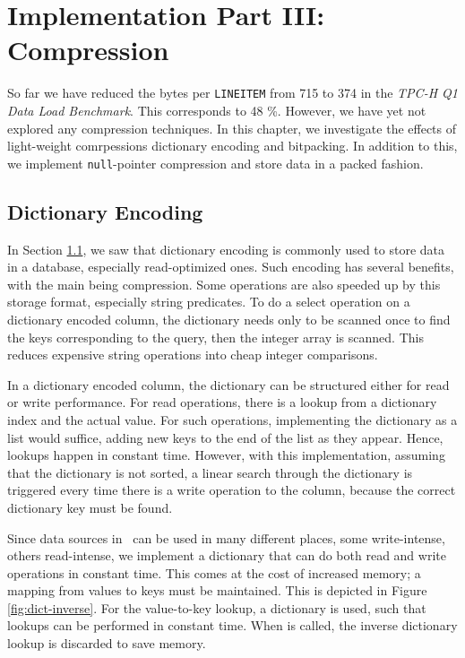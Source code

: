 \chapter{Implementation Part III: Compression}
\label{chap:Compression}
So far we have reduced the bytes per \texttt{LINEITEM} from 715 to 374 in the \textit{TPC-H Q1 Data Load Benchmark}. This corresponds to 48 \%. However, we have yet not explored any compression techniques. In this chapter, we investigate the effects of light-weight comrpessions dictionary encoding and bitpacking. In addition to this, we implement \texttt{null}-pointer compression and store data in a packed fashion.

\section{Dictionary Encoding}
\label{sec:Dictionary Encoding}
In Section \ref{sec:Dictionary Encoding}, we saw that dictionary encoding is commonly used to store data in a database, especially read-optimized ones. Such encoding has several benefits, with the main being compression. Some operations are also speeded up by this storage format, especially string predicates. To do a select operation on a dictionary encoded column, the dictionary needs only to be scanned once to find the keys corresponding to the query, then the integer array is scanned. This reduces expensive string operations into cheap integer comparisons.

In a dictionary encoded column, the dictionary can be structured either for read or write performance. For read operations, there is a lookup from a dictionary index and the actual value. For such operations, implementing the dictionary as a list would suffice, adding new keys to the end of the list as they appear. Hence, lookups happen in constant time. However, with this implementation, assuming that the dictionary is not sorted, a linear search through the dictionary is triggered every time there is a write operation to the column, because the correct dictionary key must be found. 

Since data sources in \gap~can be used in many different places, some write-intense, others read-intense, we implement a dictionary that can do both read and write operations in constant time. This comes at the cost of increased memory; a mapping from values to keys must be maintained. This is depicted in Figure \ref{fig:dict-inverse}. For the value-to-key lookup, a dictionary is used, such that lookups can be performed in constant time. When  is called, the inverse dictionary lookup is discarded to save memory. 

